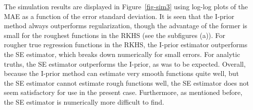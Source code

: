 \documentclass[preprint,12pt,authoryear]{elsarticle}
\begin{document}
The simulation results are displayed in Figure~\ref{fig-sim3} using log-log plots of the MAE as a function of the error standard deviation.
It is seen that the I-prior method always outperforms regularization, though the advantage of the former is small for the roughest functions in the RKHS (see the subfigures (a)).
For rougher true regression functions in the RKHS, the I-prior estimator outperforms the SE estimator, which breaks down numerically for small errors. For analytic truths, the SE estimator outperforms the I-prior, as was to be expected. 
Overall, because the I-prior method can estimate very smooth functions quite well, but the SE estimator cannot estimate rough functions well, the SE estimator does not seem satisfactory for use in the present case. Furthermore, as mentioned before, the SE estimator is numerically more difficult to find.


\end{document}
